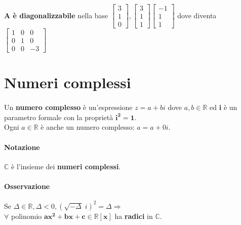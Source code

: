 \documentclass[a4paper, 12pt]{report}
\begin{document}
                    \textbf{A è diagonalizzabile} nella base $
                    \begin{bmatrix}
                        3\\
                        1\\
                        0
                    \end{bmatrix},
                    \begin{bmatrix}
                        3\\
                        1\\
                        1
                    \end{bmatrix}
                    \begin{bmatrix}
                        -1\\
                        1\\
                        1
                    \end{bmatrix}$ dove diventa $
                    \begin{bmatrix}
                        1 & 0 & 0\\
                        0 & 1 & 0\\
                        0 & 0 & -3
                    \end{bmatrix}
                    $
                    \clearpage
            \section{Numeri complessi}
                \paragraph{}Un \textbf{numero complesso} è un'espressione $z=a+bi$ dove $a,b \in \mathbb{R}$ ed \textbf{i} è un parametro formale con la proprietà $\boldsymbol{i^2=1}$.\\
                Ogni $a \in \mathbb{R}$ è anche un numero complesso: $a=a+0i$.
                \paragraph{Notazione} $\mathbb{C}$ è l'insieme dei \textbf{numeri complessi}.
                \paragraph{Osservazione} Se $\Delta \in \mathbb{R}, \Delta < 0, (\sqrt{-\Delta}\;i)^2=\Delta \Rightarrow$\\
                $\boldsymbol{\forall}$ polinomio $\boldsymbol{ax^2+bx+c \in \mathbb{R}[x]}$ ha \textbf{radici} in $\boldsymbol{\mathbb{C}}$.
\end{document}
